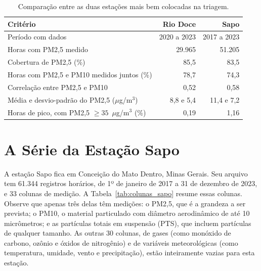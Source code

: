 \begin{table}[htbp]
    \centering
    \caption{Comparação entre as duas estações mais bem colocadas na triagem.}
    \label{tab:escolha_estacao}
    \small
    \begin{tabular}{lrr}
        \toprule
        \textbf{Critério} & \textbf{Rio Doce} & \textbf{Sapo} \\
        \midrule
        Período com dados & 2020 a 2023 & 2017 a 2023 \\
        Horas com PM2,5 medido & 29.965 & 51.205 \\
        Cobertura de PM2,5 (\%) & 85,5 & 83,5 \\
        Horas com PM2,5 e PM10 medidos juntos (\%) & 78,7 & 74,3 \\
        Correlação entre PM2,5 e PM10 & 0,52 & 0,58 \\
        Média e desvio-padrão do PM2,5 (\(\mu\)g/m\(^3\)) & 8,8 e 5,4 & 11,4 e 7,2 \\
        Horas de pico, com PM2,5 \(\geq 35\)~\(\mu\)g/m\(^3\) (\%) & 0,19 & 1,16 \\
        \bottomrule
    \end{tabular}
\end{table}

\section{A Série da Estação Sapo}
\label{sec:dados}

A estação Sapo fica em Conceição do Mato Dentro, Minas Gerais. Seu arquivo tem 61.344 registros horários, de 1º de janeiro de 2017 a 31 de dezembro de 2023, e 33 colunas de medição. A Tabela~\ref{tab:colunas_sapo} resume essas colunas. Observe que apenas três delas têm medições: o PM2,5, que é a grandeza a ser prevista; o PM10, o material particulado com diâmetro aerodinâmico de até 10 micrômetros; e as partículas totais em suspensão (PTS), que incluem partículas de qualquer tamanho. As outras 30 colunas, de gases (como monóxido de carbono, ozônio e óxidos de nitrogênio) e de variáveis meteorológicas (como temperatura, umidade, vento e precipitação), estão inteiramente vazias para esta estação.

